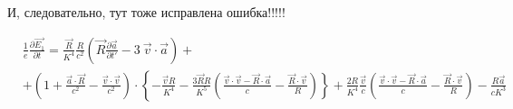 \documentclass[11pt]{article}
\begin{document}
И, следовательно, тут тоже исправлена ошибка!!!!!

\[\begin{align}
  & \frac{1}{e}\frac{\partial \overrightarrow{{{E}_{1}}}}{\partial t}=\frac{\overrightarrow{R}}{{{K}^{4}}}\frac{R}{{{c}^{2}}}\left( \overrightarrow{R}\frac{\partial \overrightarrow{a}}{\partial t'}-3\ \overrightarrow{v}\cdot \overrightarrow{a} \right)+ \\ 
 & +\left( 1+\frac{\overrightarrow{a}\cdot \overrightarrow{R}}{{{c}^{2}}}-\frac{\overrightarrow{v}\cdot \overrightarrow{v}}{{{c}^{2}}} \right)\cdot \left\{ -\frac{\overrightarrow{v}R}{{{K}^{4}}}-\frac{3\overrightarrow{R}R}{{{K}^{5}}}\left( \frac{\overrightarrow{v}\cdot \overrightarrow{v}-\overrightarrow{R}\cdot \overrightarrow{a}}{c}-\frac{\overrightarrow{R}\cdot \overrightarrow{v}}{R} \right) \right\}+\frac{2R}{{{K}^{4}}}\frac{\overrightarrow{v}}{c}\left( \frac{\overrightarrow{v}\cdot \overrightarrow{v}-\overrightarrow{R}\cdot \overrightarrow{a}}{c}-\frac{\overrightarrow{R}\cdot \overrightarrow{v}}{R} \right)-\frac{R\overrightarrow{a}}{c{{K}^{3}}} \\ 
\end{align}\]
\end{document}
